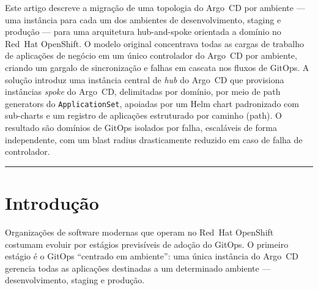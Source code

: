 \documentclass[11pt,a4paper]{article}
\begin{document}
\begin{titlepage}
  \noindent\colorbox{rhlightgray}{%
    \begin{minipage}{\linewidth}
      \vspace{6pt}
      \hspace{6pt}{\small\bfseries Resumo}\par
      \vspace{2pt}
      \hspace{6pt}\parbox{0.97\linewidth}{%
        \small
        Este artigo descreve a migração de uma topologia do Argo~CD por ambiente ---
        uma instância para cada um dos ambientes de desenvolvimento, staging e produção ---
        para uma arquitetura hub-and-spoke orientada a domínio no Red~Hat OpenShift.
        O modelo original concentrava todas as cargas de trabalho de aplicações de negócio
        em um único controlador do Argo~CD por ambiente, criando um gargalo de sincronização
        e falhas em cascata nos fluxos de GitOps.
        A solução introduz uma instância central de \emph{hub} do Argo~CD que provisiona
        instâncias \emph{spoke} do Argo~CD, delimitadas por domínio, por meio de path
        generators do \texttt{ApplicationSet}, apoiadas por um Helm chart padronizado com
        sub-charts e um registro de aplicações estruturado por caminho (path).
        O resultado são domínios de GitOps isolados por falha, escaláveis de forma
        independente, com um blast radius drasticamente reduzido em caso de falha de
        controlador.
      }
      \vspace{6pt}
    \end{minipage}%
  }

  \vspace{8mm}
  \noindent\textcolor{rhred}{\rule{\linewidth}{2pt}}
  \restoregeometry
\end{titlepage}

\tableofcontents
\newpage

\section{Introdução}
\label{sec:intro}

Organizações de software modernas que operam no Red~Hat OpenShift costumam evoluir por
estágios previsíveis de adoção do GitOps.
O primeiro estágio é o GitOps ``centrado em ambiente'': uma única instância do Argo~CD
gerencia todas as aplicações destinadas a um determinado ambiente --- desenvolvimento,
staging e produção.
\end{document}
